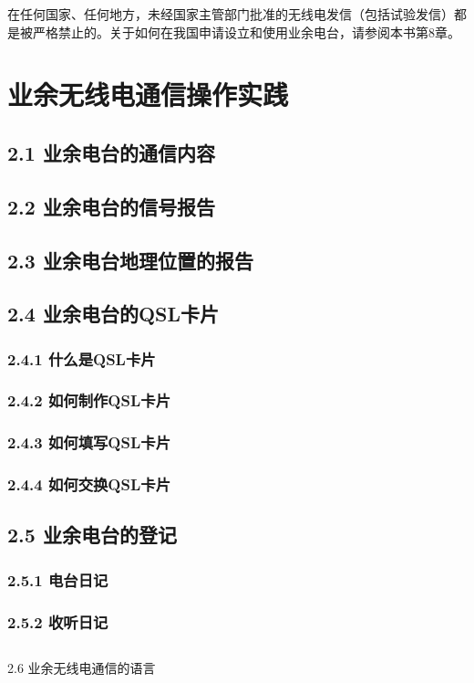 \documentclass[12pt,UTF8]{ctexbook}
\begin{document}
在任何国家、任何地方，未经国家主管部门批准的无线电发信（包括试验发信）都是被严格禁止的。关于如何在我国申请设立和使用业余电台，请参阅本书第8章。

\chapter{业余无线电通信操作实践}

\section{2.1 业余电台的通信内容}
\section{2.2 业余电台的信号报告}
\section{2.3 业余电台地理位置的报告}
\section{2.4 业余电台的QSL卡片}
\subsection{2.4.1 什么是QSL卡片}
\subsection{2.4.2 如何制作QSL卡片}
\subsection{2.4.3 如何填写QSL卡片}
\subsection{2.4.4 如何交换QSL卡片}
\section{2.5 业余电台的登记}
\subsection{2.5.1 电台日记}
\subsection{2.5.2 收听日记}
\section{}2.6 业余无线电通信的语言
\end{document}
